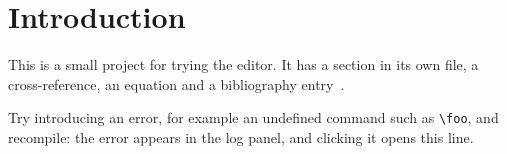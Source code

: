 \section{Introduction}
\label{sec:intro}
This is a small project for trying the editor. It has a section in its own
file, a cross-reference, an equation and a bibliography entry~\cite{knuth1984}.

Try introducing an error, for example an undefined command such as
\verb|\foo|, and recompile: the error appears in the log panel, and clicking
it opens this line.
